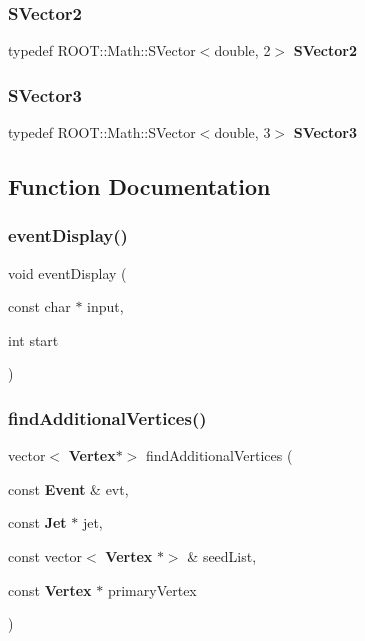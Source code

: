 \mbox{\label{Driver_8cc_a901d42b98db70e0c0cbb46c593aae8c6}} 
\subsubsection{S\+Vector2}
{\footnotesize\ttfamily typedef R\+O\+O\+T\+::\+Math\+::\+S\+Vector$<$double, 2$>$ \textbf{ S\+Vector2}}

\mbox{\label{Driver_8cc_a846514e7d7faddbf385e2bda031cd834}} 
\subsubsection{S\+Vector3}
{\footnotesize\ttfamily typedef R\+O\+O\+T\+::\+Math\+::\+S\+Vector$<$double, 3$>$ \textbf{ S\+Vector3}}



\subsection{Function Documentation}
\mbox{\label{Driver_8cc_a4c66a8e7242c670d93c17321c593215b}} 
\subsubsection{event\+Display()}
{\footnotesize\ttfamily void event\+Display (\begin{DoxyParamCaption}\item[{const char $\ast$}]{input,  }\item[{int}]{start }\end{DoxyParamCaption})}

\mbox{\label{Driver_8cc_a9f1b1662d1e2f5906a5ac5e14ece41c3}} 
\subsubsection{find\+Additional\+Vertices()}
{\footnotesize\ttfamily vector$<$\textbf{ Vertex}$\ast$$>$ find\+Additional\+Vertices (\begin{DoxyParamCaption}\item[{const \textbf{ Event} \&}]{evt,  }\item[{const \textbf{ Jet} $\ast$}]{jet,  }\item[{const vector$<$ \textbf{ Vertex} $\ast$$>$ \&}]{seed\+List,  }\item[{const \textbf{ Vertex} $\ast$}]{primary\+Vertex }\end{DoxyParamCaption})}



